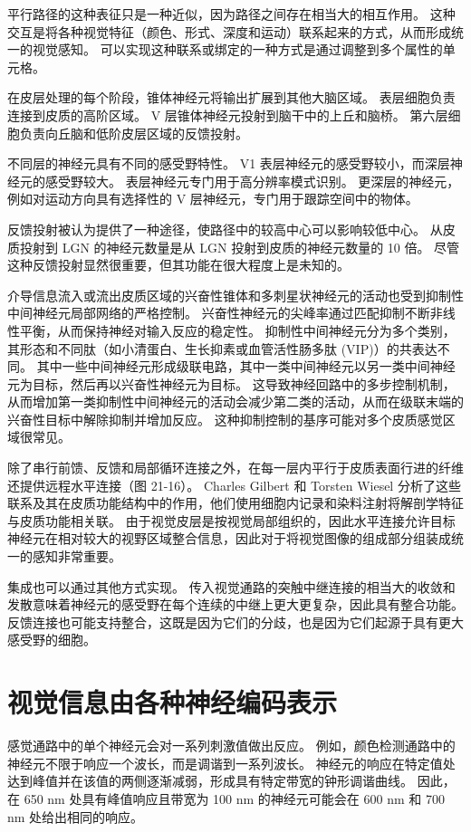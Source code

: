 平行路径的这种表征只是一种近似，因为路径之间存在相当大的相互作用。 这种交互是将各种视觉特征（颜色、形式、深度和运动）联系起来的方式，从而形成统一的视觉感知。 可以实现这种联系或绑定的一种方式是通过调整到多个属性的单元格。

在皮层处理的每个阶段，锥体神经元将输出扩展到其他大脑区域。 表层细胞负责连接到皮质的高阶区域。 V 层锥体神经元投射到脑干中的上丘和脑桥。 第六层细胞负责向丘脑和低阶皮层区域的反馈投射。

不同层的神经元具有不同的感受野特性。 V1 表层神经元的感受野较小，而深层神经元的感受野较大。 表层神经元专门用于高分辨率模式识别。 更深层的神经元，例如对运动方向具有选择性的 V 层神经元，专门用于跟踪空间中的物体。

反馈投射被认为提供了一种途径，使路径中的较高中心可以影响较低中心。 从皮质投射到 LGN 的神经元数量是从 LGN 投射到皮质的神经元数量的 10 倍。 尽管这种反馈投射显然很重要，但其功能在很大程度上是未知的。

介导信息流入或流出皮质区域的兴奋性锥体和多刺星状神经元的活动也受到抑制性中间神经元局部网络的严格控制。 兴奋性神经元的尖峰率通过匹配抑制不断非线性平衡，从而保持神经对输入反应的稳定性。 抑制性中间神经元分为多个类别，其形态和不同肽（如小清蛋白、生长抑素或血管活性肠多肽 (VIP)）的共表达不同。 其中一些中间神经元形成级联电路，其中一类中间神经元以另一类中间神经元为目标，然后再以兴奋性神经元为目标。 这导致神经回路中的多步控制机制，从而增加第一类抑制性中间神经元的活动会减少第二类的活动，从而在级联末端的兴奋性目标中解除抑制并增加反应。 这种抑制控制的基序可能对多个皮质感觉区域很常见。

除了串行前馈、反馈和局部循环连接之外，在每一层内平行于皮质表面行进的纤维还提供远程水平连接（图 21-16）。 Charles Gilbert 和 Torsten Wiesel 分析了这些联系及其在皮质功能结构中的作用，他们使用细胞内记录和染料注射将解剖学特征与皮质功能相关联。 由于视觉皮层是按视觉局部组织的，因此水平连接允许目标神经元在相对较大的视野区域整合信息，因此对于将视觉图像的组成部分组装成统一的感知非常重要。

集成也可以通过其他方式实现。 传入视觉通路的突触中继连接的相当大的收敛和发散意味着神经元的感受野在每个连续的中继上更大更复杂，因此具有整合功能。 反馈连接也可能支持整合，这既是因为它们的分歧，也是因为它们起源于具有更大感受野的细胞。


\section{视觉信息由各种神经编码表示}
感觉通路中的单个神经元会对一系列刺激值做出反应。 例如，颜色检测通路中的神经元不限于响应一个波长，而是调谐到一系列波长。 神经元的响应在特定值处达到峰值并在该值的两侧逐渐减弱，形成具有特定带宽的钟形调谐曲线。 因此，在 650 nm 处具有峰值响应且带宽为 100 nm 的神经元可能会在 600 nm 和 700 nm 处给出相同的响应。

